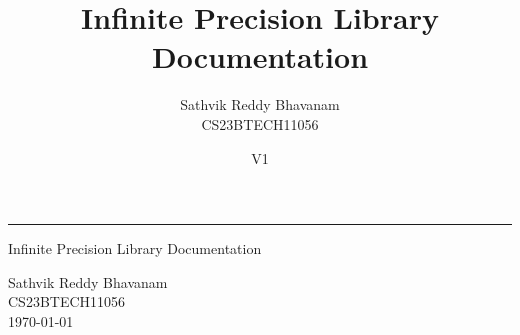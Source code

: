 \documentclass{article} %
\title{\huge \sffamily Infinite Precision Library Documentation}
\author{\sffamily Sathvik Reddy Bhavanam\\[2mm] \sffamily CS23BTECH11056}
\date{V1}
\begin{document}
\thispagestyle{empty}
\vspace*{3cm}
\hspace*{-7mm}\rule{\linewidth}{3pt}
\vspace*{1cm}
\begin{center}
	{\Huge \sffamily Infinite Precision Library Documentation} \\[3em]
\end{center}
{\hfill \Large \sffamily Sathvik Reddy Bhavanam} \\[2em]
{\vspace*{1em} \hfill\large \sffamily CS23BTECH11056} \\[24em]
{\vspace*{1em} \hfill\large \sffamily \today}

\newpage

\tableofcontents
\newpage

 
\newpage
 
\newpage

\newpage
 
\newpage
 
\newpage

\end{document}
